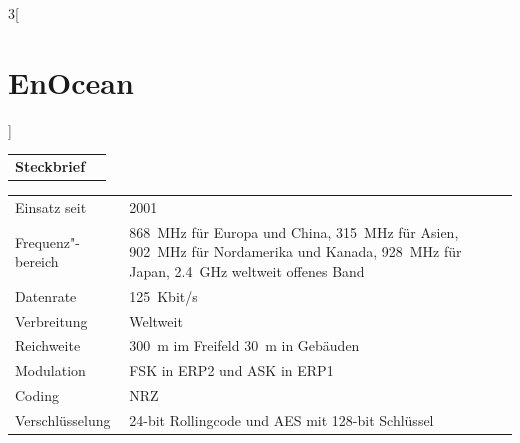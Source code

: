\begin{multicols}{3}[\section{EnOcean}]


\newrefsegment

\begin{tabular}{p{}p{2.7 cm}}
\textbf{Steckbrief}& \\
\end{tabular}
\begin{tabular}{p{}p{2.7 cm}}
      Einsatz seit & 2001\\
      Frequenz"-bereich  & \SI{868}{\mega\hertz} für Europa und China, \SI{315}{\mega\hertz} für Asien, \SI{902}{\mega\hertz} für Nordamerika und Kanada, \SI{928}{\mega\hertz} für Japan, \SI{2,4}{\giga\hertz} weltweit offenes Band\\
      Datenrate & \SI{125}{Kbit/s} \\
      Verbreitung & Weltweit\\
      Reichweite & \SI{300}{\metre} im Freifeld \SI{30}{\metre} in Gebäuden\\
      Modulation & FSK in ERP2 und ASK in ERP1\\
      Coding & NRZ\\
      Verschlüsselung & 24-bit Rollingcode und AES mit 128-bit Schlüssel\\
\end{tabular}
\par

\end{multicols}
